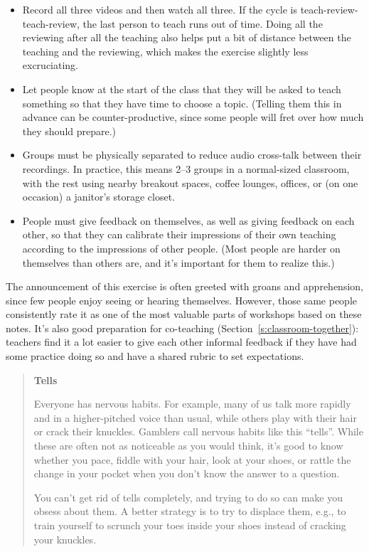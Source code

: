 \begin{itemize}
\item
  Record all three videos and then watch all three. If the cycle is
  teach-review-teach-review, the last person to teach runs out of
  time. Doing all the reviewing after all the teaching also helps put
  a bit of distance between the teaching and the reviewing, which
  makes the exercise slightly less excruciating.
\item
  Let people know at the start of the class that they will be asked to
  teach something so that they have time to choose a topic. (Telling
  them this in advance can be counter-productive, since some people
  will fret over how much they should prepare.)
\item
  Groups must be physically separated to reduce audio cross-talk
  between their recordings. In practice, this means 2--3 groups in a
  normal-sized classroom, with the rest using nearby breakout spaces,
  coffee lounges, offices, or (on one occasion) a janitor's storage
  closet.
\item
  People must give feedback on themselves, as well as giving feedback
  on each other, so that they can calibrate their impressions of their
  own teaching according to the impressions of other people. (Most
  people are harder on themselves than others are, and it's important
  for them to realize this.)
\end{itemize}

The announcement of this exercise is often greeted with groans and
apprehension, since few people enjoy seeing or hearing themselves.
However, those same people consistently rate it as one of the most
valuable parts of workshops based on these notes. It's also good
preparation for co-teaching (Section~\ref{s:classroom-together}):
teachers find it a lot easier to give each other informal feedback if
they have had some practice doing so and have a shared rubric to set
expectations.

\begin{quote}\setlength{\parindent}{0pt}
\textbf{Tells}

Everyone has nervous habits. For example, many of us talk more rapidly
and in a higher-pitched voice than usual, while others play with their
hair or crack their knuckles. Gamblers call nervous habits like this
``tells''. While these are often not as noticeable as you would think,
it's good to know whether you pace, fiddle with your hair, look at
your shoes, or rattle the change in your pocket when you don't know
the answer to a question.

You can't get rid of tells completely, and trying to do so can make
you obsess about them. A better strategy is to try to displace them,
e.g., to train yourself to scrunch your toes inside your shoes instead
of cracking your knuckles.
\end{quote}

